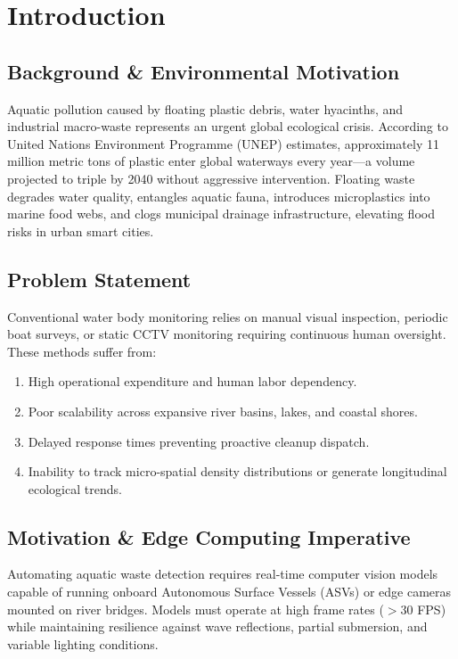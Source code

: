 \documentclass[10pt,journal,compsoc]{IEEEtran}
\begin{document}
\section{Introduction}

\subsection{Background \& Environmental Motivation}
Aquatic pollution caused by floating plastic debris, water hyacinths, and industrial macro-waste represents an urgent global ecological crisis. According to United Nations Environment Programme (UNEP) estimates, approximately 11 million metric tons of plastic enter global waterways every year---a volume projected to triple by 2040 without aggressive intervention. Floating waste degrades water quality, entangles aquatic fauna, introduces microplastics into marine food webs, and clogs municipal drainage infrastructure, elevating flood risks in urban smart cities.

\subsection{Problem Statement}
Conventional water body monitoring relies on manual visual inspection, periodic boat surveys, or static CCTV monitoring requiring continuous human oversight. These methods suffer from:
\begin{enumerate}
    \item High operational expenditure and human labor dependency.
    \item Poor scalability across expansive river basins, lakes, and coastal shores.
    \item Delayed response times preventing proactive cleanup dispatch.
    \item Inability to track micro-spatial density distributions or generate longitudinal ecological trends.
\end{enumerate}

\subsection{Motivation \& Edge Computing Imperative}
Automating aquatic waste detection requires real-time computer vision models capable of running onboard Autonomous Surface Vessels (ASVs) or edge cameras mounted on river bridges. Models must operate at high frame rates ($>30$ FPS) while maintaining resilience against wave reflections, partial submersion, and variable lighting conditions.
\end{document}
